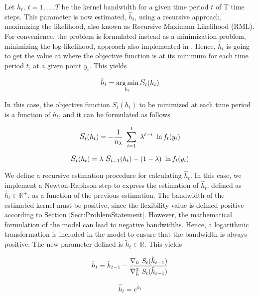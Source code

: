 Let ${h}_{t}, \ t=1,...,T$ be the kernel bandwidth for a given time period $t$ of T time steps. This parameter is now estimated, $\hat{h}_{t}$, using a recursive approach, maximizing the likelihood, also known as Recursive Maximum Likelihood (RML). For convenience, the problem is formulated instead as a minimization problem, minimizing the log-likelihood, approach also implemented in \cite{Pinson2009, Pinson_Madsen_2012}. Hence, $\hat{h}_{t}$ is going to get the value at where the objective function is at its minimum for each time period $t$, at a given point $y_i$. This yields

\begin{equation}
    \hat{h}_{t} = \argmin_{h_{t}} \mathlarger{S}_t (h_{t}) 
\end{equation} 

In this case, the objective function $S_t(h_{t})$ to be minimized at each time period is a function of $h_{t}$, and it can be formulated as follows 

\begin{equation}
    \mathlarger{S}_t (h_{t}) = -\frac{1}{n_{\lambda}}\ \sum_{i=1}^{t} \ \lambda^{t-i} \ \ln f_t(y_i)
\end{equation}

\begin{equation}
    \mathlarger{S}_t (h_{t}) = \lambda \ \mathlarger{S}_{t-1}(h_{t}) - (1-\lambda) \  \ln f_t(y_i)
\end{equation}

We define a recursive estimation procedure for calculating $\hat{h}_{t}$. In this case, we implement a Newton-Raphson step to express the estimation of $\hat{h}_{t}$, defined as $\hat{h}_t \in \mathbb{R}^+$, as a function of the previous estimation. 
The bandwidth of the estimated kernel must be positive, since the flexibility value is defined positive according to Section \ref{Sect:ProblemStatement}. However, the mathematical formulation of the model can lead to negative bandwidths. Hence, a logarithmic transformation is included in the model to ensure that the bandwidth is always positive. The new parameter defined is $\tilde{h}_t \in \mathbb{R}$. This yields

\begin{equation}
    \tilde{h}_t = \tilde{h}_{t-1} - \frac{ \nabla_h \ \mathlarger{S}_t (\hat{h}_{t-1}) }{\nabla^2_h \ \mathlarger{S}_t (\hat{h}_{t-1})}
\end{equation}

\begin{equation}
    \hat{h}_t = e^{\tilde{h}_t}
\end{equation}

